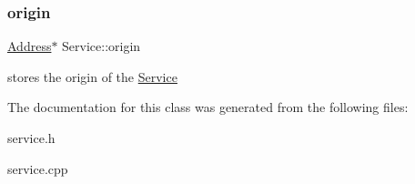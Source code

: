 \subsubsection{\texorpdfstring{origin}{origin}}
{\footnotesize\ttfamily \hyperlink{class_address}{Address}$\ast$ Service\+::origin\hspace{0.3cm}{\ttfamily [protected]}}

stores the origin of the \hyperlink{class_service}{Service} 

The documentation for this class was generated from the following files\+:\begin{DoxyCompactItemize}
\item 
service.\+h\item 
service.\+cpp\end{DoxyCompactItemize}
